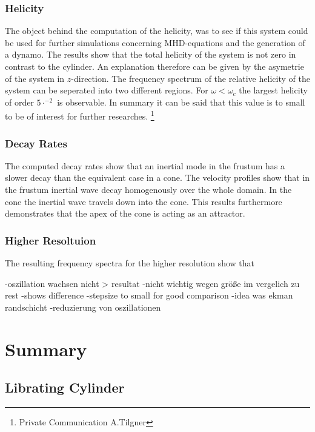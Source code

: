 \subsubsection{Helicity}

The object behind the computation of the helicity, was to see if this system could be used
for further simulations concerning MHD-equations and the generation of a dynamo.
The results show that the total helicity of the system is not zero in contrast to the cylinder.
An explanation therefore can be given by the asymetrie of the system in $z$-direction.
The frequency spectrum of the relative helicity of the  system can be seperated into two different regions.
For $\omega<\omega_c$ the largest helicity of order $5\cdot^{-2}$ is observable.
In summary it can be said that this value is to small to be of interest for further researches.
\footnote{Private Communication A.Tilgner}


\subsubsection{Decay Rates}

The computed decay rates show that an inertial mode in the frustum has a slower decay
than the equivalent case in a cone.
The velocity profiles show that in the frustum inertial wave decay homogenously over the whole domain.
In the cone the inertial wave travels down into the cone.
This results furthermore demonstrates that the apex of the cone is acting as an attractor.

\subsubsection{Higher Resoltuion}

The resulting frequency spectra for the higher resolution show that


-oszillation wachsen nicht > resultat
-nicht wichtig wegen größe im vergelich zu rest
-shows difference
-stepsize to small for good comparison
-idea was ekman randschicht
-reduzierung von oszillationen

\clearpage

\section{Summary}

\subsection{Librating Cylinder}


